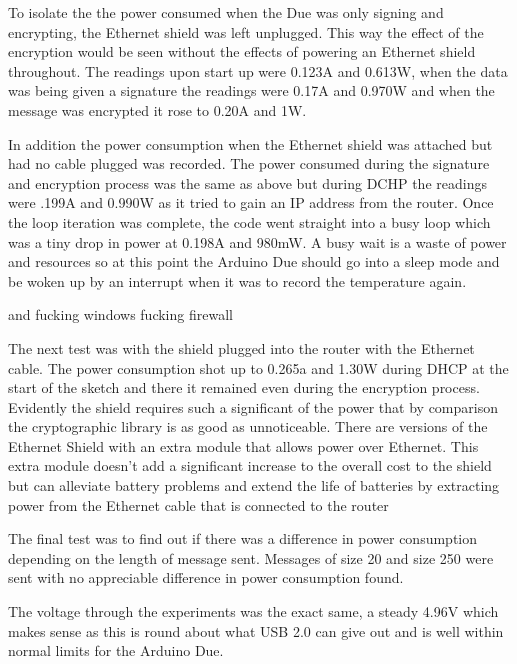 To isolate the the power consumed when the Due was only signing and encrypting, the Ethernet shield was left unplugged. This way the effect of the encryption would be seen without the effects of powering an Ethernet shield throughout. 
The readings upon start up were 0.123A and 0.613W, when the data was being given a signature the readings were 0.17A and 0.970W and when the message was encrypted it rose to 0.20A and 1W. 

In addition the power consumption when the Ethernet shield was attached but had no cable plugged was recorded. The power consumed during the signature and encryption process was the same as above but during DCHP the readings were .199A and 0.990W as it tried to gain an IP address from the router. Once the loop iteration was complete, the code went straight into a busy loop which was a tiny drop in power at 0.198A and 980mW. A busy wait is a waste of power and resources so at this point the Arduino Due should go into a sleep mode and be woken up by an interrupt when it was to record the temperature again. 


and fucking windows fucking firewall

The next test was with the shield plugged into the router with the Ethernet cable. The power consumption shot up to 0.265a and 1.30W during DHCP at the start of the sketch and there it remained even during the encryption process. Evidently the shield requires such a significant of the power that by comparison the cryptographic library is as good as unnoticeable. There are versions of the Ethernet Shield with an extra module that allows power over Ethernet. This extra module doesn't add a significant increase to the overall cost to the shield but can alleviate battery problems and extend the life of batteries by extracting power from the Ethernet cable that is connected to the router

The final test was to find out if there was a difference in power consumption depending on the length of message sent. Messages of size 20 and size 250 were sent with no appreciable difference in power consumption found.


The voltage through the experiments was the exact same, a steady 4.96V which makes sense as this is round about what USB 2.0 can give out and is well within normal limits for the Arduino Due.




